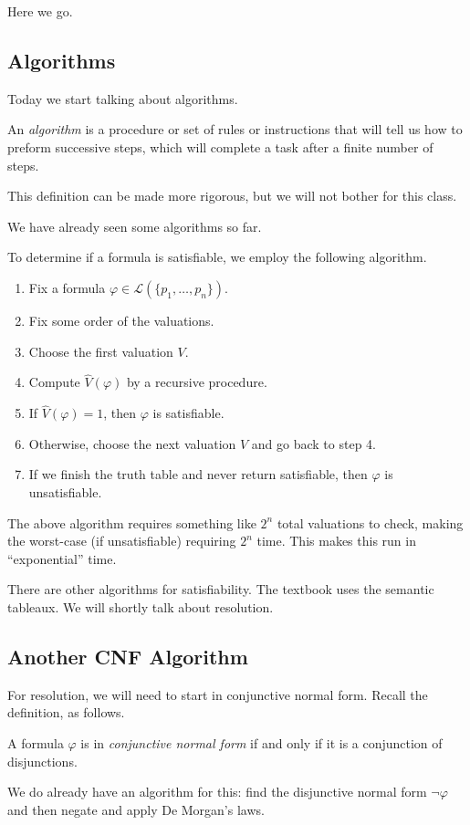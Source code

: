 
Here we go.

\subsection{Algorithms}
Today we start talking about algorithms.
\begin{definition}[Algorithm]
	An \textit{algorithm} is a procedure or set of rules or instructions that will tell us how to preform successive steps, which will complete a task after a finite number of steps.
\end{definition}
This definition can be made more rigorous, but we will not bother for this class.

We have already seen some algorithms so far.
\begin{example}
	To determine if a formula is satisfiable, we employ the following algorithm.
	\begin{enumerate}
		\item Fix a formula $\varphi\in\mathcal L(\{p_1,\ldots,p_n\})$.
		\item Fix some order of the valuations.
		\item Choose the first valuation $V$.
		\item Compute $\hat V(\varphi)$ by a recursive procedure.
		\item If $\hat V(\varphi)=1$, then $\varphi$ is satisfiable.
		\item Otherwise, choose the next valuation $V$ and go back to step 4.
		\item If we finish the truth table and never return satisfiable, then $\varphi$ is unsatisfiable.
	\end{enumerate}
\end{example}
\begin{remark}
	The above algorithm requires something like $2^n$ total valuations to check, making the worst-case (if unsatisfiable) requiring $2^n$ time. This makes this run in ``exponential'' time.
\end{remark}
\begin{remark}
	There are other algorithms for satisfiability. The textbook uses the semantic tableaux. We will shortly talk about resolution.
\end{remark}

\subsection{Another CNF Algorithm}
For resolution, we will need to start in conjunctive normal form. Recall the definition, as follows.
\begin{definition}
	A formula $\varphi$ is in \textit{conjunctive normal form} if and only if it is a conjunction of disjunctions.
\end{definition}
We do already have an algorithm for this: find the disjunctive normal form $\lnot\varphi$ and then negate and apply De Morgan's laws.

